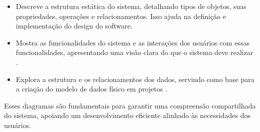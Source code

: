 \begin{itemize}
    \item Descreve a estrutura estática do sistema, detalhando tipos de objetos, suas propriedades, operações e relacionamentos. Isso ajuda na definição e implementação do design do software.
    \item Mostra as funcionalidades do sistema e as interações dos usuários com essas funcionalidades, apresentando uma visão clara do que o sistema deve realizar \cite{sommerville2011}.
    \item Explora a estrutura e os relacionamentos dos dados, servindo como base para a criação do modelo de dados físico em projetos \cite{cougo1997}.
\end{itemize}

Esses diagramas são fundamentais para garantir uma compreensão compartilhada do sistema, apoiando um desenvolvimento eficiente alinhado às necessidades dos usuários.
